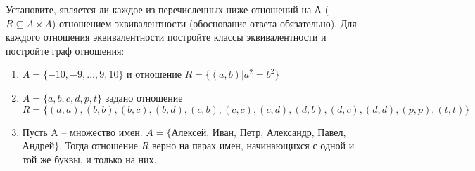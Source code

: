 \question
Установите, является ли каждое из перечисленных ниже отношений на А ($R \subseteq A \times A$) отношением эквивалентности (обоснование ответа обязательно). Для каждого отношения эквивалентности постройте классы 
эквивалентности и постройте граф отношения:
\begin{enumerate}
	\renewcommand{\labelenumi}{\alph{enumi})}
	\item $A = \{-10, -9, … , 9, 10\}$ и отношение $R = \{(a,b)|a^{2} = b^{2}\}$
	\item $A = \{a, b, c, d, p, t\}$ задано отношение $R = \{(a, a), (b, b), (b, c), (b, d), (c, b), (c, c), (c, d), (d, b), (d, c), (d, d), (p,p), (t,t)\}$
	\item Пусть A – множество имен. $A = \{ $Алексей, Иван, Петр, Александр, Павел, Андрей$ \}$. Тогда отношение $R$ верно на парах имен, начинающихся с одной и той же буквы, и только на них.
\end{enumerate}